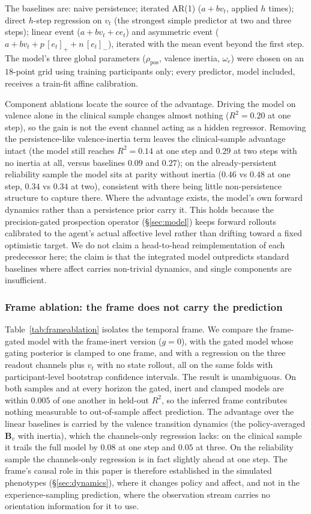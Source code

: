 \documentclass[11pt,a4paper]{article}
\begin{document}
The baselines are: naive persistence; iterated AR(1) ($a+bv_t$, applied $h$ times);
direct $h$-step regression on $v_t$ (the strongest simple predictor at two and three
steps); linear event ($a+bv_t+ce_t$) and asymmetric event ($a+bv_t+p\,[e_t]_+ +
n\,[e_t]_-$), iterated with the mean event beyond the first step. The model's three
global parameters ($\rho_{\text{pos}}$, valence inertia, $\omega_e$) were chosen on
an $18$-point grid using training participants only; every predictor, model included,
receives a train-fit affine calibration.

Component ablations locate the source of the advantage. Driving the model on valence
alone in the clinical sample changes almost nothing ($R^2=0.20$ at one step), so the
gain is not the event channel acting as a hidden regressor. Removing the
persistence-like valence-inertia term leaves the clinical-sample advantage intact
(the model still reaches $R^2=0.14$ at one step and $0.29$ at two steps with no inertia
at all, versus baselines $0.09$ and $0.27$); on the already-persistent reliability
sample the model sits at parity without inertia ($0.46$ vs $0.48$ at one step,
$0.34$ vs $0.34$ at two), consistent with there being little non-persistence structure
to capture there. Where the advantage exists, the model's own forward dynamics rather
than a persistence prior carry it. This holds
because the precision-gated prospection operator (\S\ref{sec:model}) keeps forward
rollouts calibrated to the agent's actual affective level rather than drifting toward a
fixed optimistic target. We do not claim a head-to-head reimplementation of each
predecessor here; the claim is that the integrated model outpredicts standard baselines
where affect carries non-trivial dynamics, and single components are insufficient.

\subsubsection{Frame ablation: the frame does not carry the prediction}\label{sec:esm-ablation}
Table~\ref{tab:frameablation} isolates the temporal frame. We compare the frame-gated
model with the frame-inert version ($g=0$), with the gated model whose gating
posterior is clamped to one frame, and with a regression on the three readout channels
plus $v_t$ with no state rollout, all on the same folds with participant-level
bootstrap confidence intervals. The result is unambiguous. On both samples and at
every horizon the gated, inert and clamped models are within $0.005$ of one another in
held-out $R^2$, so the inferred frame contributes nothing measurable to out-of-sample
affect prediction. The advantage over the linear baselines is carried by the valence
transition dynamics (the policy-averaged $\mathbf B_v$ with inertia), which the
channels-only regression lacks: on the clinical sample it trails the full model by
$0.08$ at one step and $0.05$ at three. On the reliability sample the channels-only
regression is in fact slightly ahead at one step. The frame's causal role in this
paper is therefore established in the simulated phenotypes (\S\ref{sec:dynamics}),
where it changes policy and affect, and not in the experience-sampling prediction,
where the observation stream carries no orientation information for it to use.
\end{document}
